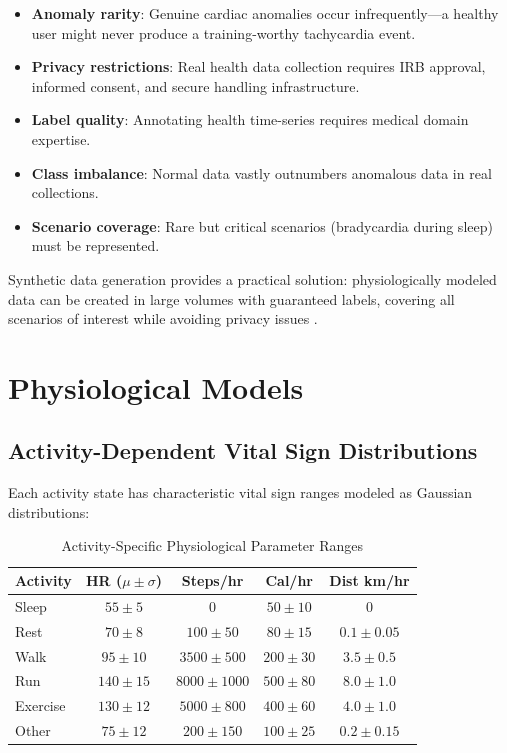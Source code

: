 \documentclass[conference]{IEEEtran}
\begin{document}
\begin{itemize}
    \item \textbf{Anomaly rarity}: Genuine cardiac anomalies occur infrequently---a healthy user might never produce a training-worthy tachycardia event.
    \item \textbf{Privacy restrictions}: Real health data collection requires IRB approval, informed consent, and secure handling infrastructure.
    \item \textbf{Label quality}: Annotating health time-series requires medical domain expertise.
    \item \textbf{Class imbalance}: Normal data vastly outnumbers anomalous data in real collections.
    \item \textbf{Scenario coverage}: Rare but critical scenarios (bradycardia during sleep) must be represented.
\end{itemize}

Synthetic data generation provides a practical solution: physiologically modeled data can be created in large volumes with guaranteed labels, covering all scenarios of interest while avoiding privacy issues \cite{synthetic_health}.

\section{Physiological Models}

\subsection{Activity-Dependent Vital Sign Distributions}
Each activity state has characteristic vital sign ranges modeled as Gaussian distributions:

\begin{table}[H]
\centering
\caption{Activity-Specific Physiological Parameter Ranges}
\label{tab:activity_params}
\begin{tabular}{lcccc}
\toprule
\textbf{Activity} & \textbf{HR ($\mu \pm \sigma$)} & \textbf{Steps/hr} & \textbf{Cal/hr} & \textbf{Dist km/hr} \\
\midrule
Sleep & $55 \pm 5$ & 0 & $50 \pm 10$ & 0 \\
Rest & $70 \pm 8$ & $100 \pm 50$ & $80 \pm 15$ & $0.1 \pm 0.05$ \\
Walk & $95 \pm 10$ & $3500 \pm 500$ & $200 \pm 30$ & $3.5 \pm 0.5$ \\
Run & $140 \pm 15$ & $8000 \pm 1000$ & $500 \pm 80$ & $8.0 \pm 1.0$ \\
Exercise & $130 \pm 12$ & $5000 \pm 800$ & $400 \pm 60$ & $4.0 \pm 1.0$ \\
Other & $75 \pm 12$ & $200 \pm 150$ & $100 \pm 25$ & $0.2 \pm 0.15$ \\
\bottomrule
\end{tabular}
\end{table}
\end{document}

